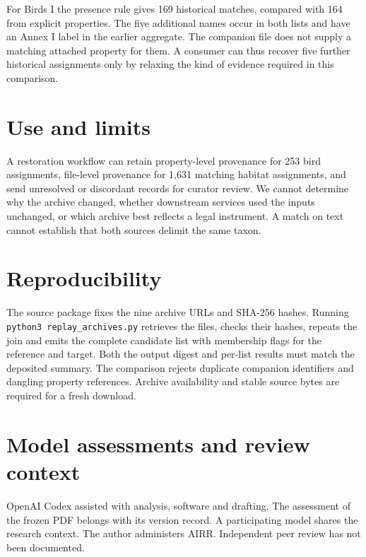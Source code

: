 \documentclass[11pt]{article}
\begin{document}
For Birds I the presence rule gives 169 historical matches, compared with 164 from explicit properties. The five additional names occur in both lists and have an Annex I label in the earlier aggregate. The companion file does not supply a matching attached property for them. A consumer can thus recover five further historical assignments only by relaxing the kind of evidence required in this comparison.
\section{Use and limits}
A restoration workflow can retain property-level provenance for 253 bird assignments, file-level provenance for 1,631 matching habitat assignments, and send unresolved or discordant records for curator review. We cannot determine why the archive changed, whether downstream services used the inputs unchanged, or which archive best reflects a legal instrument. A match on text cannot establish that both sources delimit the same taxon.
\newpage
\section*{Reproducibility}
The source package fixes the nine archive URLs and SHA-256 hashes. Running \texttt{python3 replay\_archives.py} retrieves the files, checks their hashes, repeats the join and emits the complete candidate list with membership flags for the reference and target. Both the output digest and per-list results must match the deposited summary. The comparison rejects duplicate companion identifiers and dangling property references. Archive availability and stable source bytes are required for a fresh download.
\section*{Model assessments and review context}
OpenAI Codex assisted with analysis, software and drafting. The assessment of the frozen PDF belongs with its version record. A participating model shares the research context. The author administers AIRR. Independent peer review has not been documented.
\end{document}

